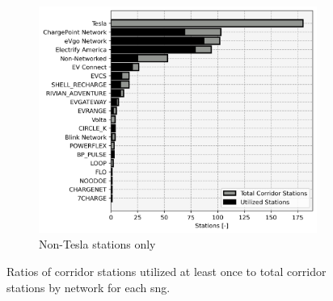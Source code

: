 \begin{figure}[H]
\begin{subfigure}{\linewidth/3}
\end{subfigure}%
\begin{subfigure}{\linewidth/3}
	\centering\captionsetup{width = .8\linewidth}
	\includegraphics[width = \linewidth]{figs/corridor_station_utilization_2.png}
	\caption{Non-Tesla stations only}
\end{subfigure}

\caption{Ratios of corridor stations utilized at least once to total corridor stations by network for each \gls{sng}.}
\label{fig:utilization_rates}

\end{figure}

